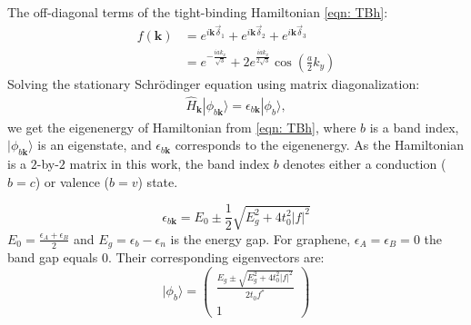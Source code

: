 The off-diagonal terms of the tight-binding Hamiltonian \ref{eqn: TBh}:
\begin{equation}
	\begin{aligned}
		f(\mathbf{k}) & =e^{i \mathbf{k} \vec{\delta}_{1}}+e^{i \mathbf{k} \vec{\delta}_{2}}+e^{i \mathbf{k} \vec{\delta}_{3}}  \\
		              & =e^{-\frac{i a k_{x}}{\sqrt{3}}}+2 e^{\frac{i a k_{x}}{2 \sqrt{3}}} \cos \left(\frac{a}{2} k_{y}\right)
	\end{aligned}
	\label{eqn:nearest_h}
\end{equation}
Solving the stationary Schrödinger equation using matrix diagonalization:
\begin{align}
	\hat{H}_{\mathbf{k}}|\phi_{b \mathbf{k}}\rangle = \epsilon_{b\mathbf{k}}|\phi_{b}\rangle,
	\label{eq:eqigenstates-h0}
\end{align}
we get the eigenenergy of Hamiltonian from \ref{eqn: TBh}, where $b$ is a band index, $|\phi_{b\mathbf{k}}\rangle$ is an eigenstate, and $\epsilon_{b\mathbf{k}}$ corresponds to the eigenenergy. As the Hamiltonian is a $2$-by-$2$ matrix in this work, the band index $b$ denotes either a conduction ($b=c$) or valence ($b=v$) state.

\begin{equation}
	\epsilon_{b\mathbf{k}}=E_{0} \pm \frac{1}{2} \sqrt{E_{g}^{2}+4t_{0}^{2}|f|^{2}}
	\label{eigenvalues}
\end{equation}
$E_{0}=\frac{\epsilon_{A}+\epsilon_{B}}{2}$ and $E_{g}=\epsilon_{b}-\epsilon_{n}$ is the energy gap. For graphene, $\epsilon_{A} = \epsilon_{B} =0$ the band gap equals 0.
Their corresponding eigenvectors are:
\begin{equation}
	|\phi_{b}\rangle  =\left(\begin{array}{cc}
			\frac{E_{g} \pm \sqrt{E_{g}^{2}+4t_{0}^{2}|f|^{2}}}{2t_{0} f^*} \\
			1
		\end{array}\right)
	\label{eqn:eigenvector}
\end{equation}
\color{red}

